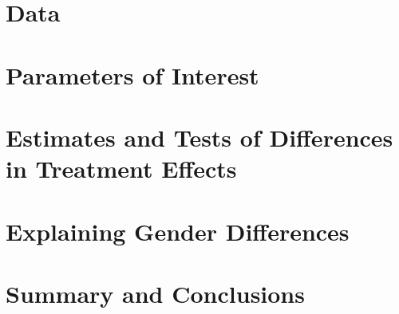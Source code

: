 \section{Data}
\label{sec:data}


\section{Parameters of Interest}
\label{sec:parameters}


\section{Estimates and Tests of Differences in Treatment Effects}
\label{sec:treatment-effects}


\section{Explaining Gender Differences}
\label{sec:gender-differences}


\section{Summary and Conclusions}
\label{sec:conclusion}


\clearpage

\singlespacing




